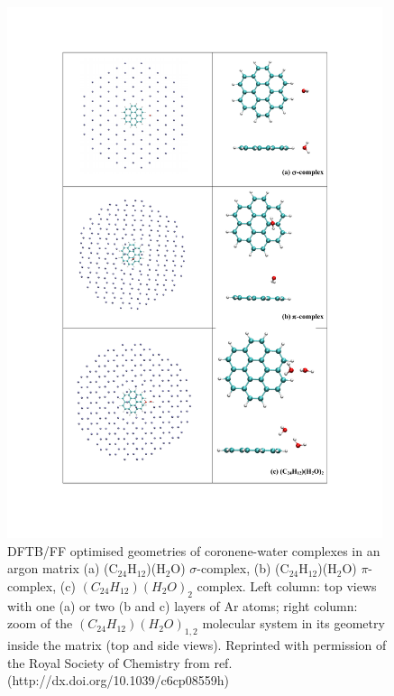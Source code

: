 \documentclass[]{interact}
\theoremstyle{plain}%
\theoremstyle{definition}
\theoremstyle{remark}
\begin{document}
	 \begin{figure}[!ht]
	 \begin{center}
\includegraphics[width=11cm]{geoms_mat.pdf}
 \end{center}
\caption{DFTB/FF optimised geometries of coronene-water complexes in an argon matrix (a) (C$_{24}$H$_{12}$)(H$_2$O) $\sigma$-complex, (b) (C$_{24}$H$_{12}$)(H$_2$O) $\pi$-complex, (c) $(C_{24}H_{12})(H_{2}O)_{2}$ complex. Left column: top views with one (a) or two (b and c) layers of Ar atoms; right column: zoom of the $(C_{24}H_{12})(H_{2}O)_{1,2}$ molecular system in its geometry inside the matrix (top and side views). Reprinted with permission of the Royal Society of Chemistry from ref. \cite{WaterCorMat_PCCP17}  (http://dx.doi.org/10.1039/c6cp08559h)  }
\label{fig:geoms_mat}
\end{figure}
\end{document}
